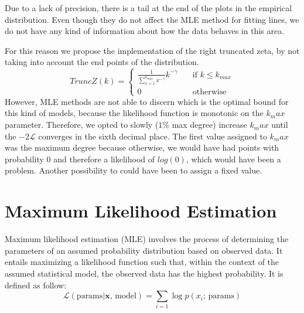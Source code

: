\documentclass{article}
\begin{document}
Due to a lack of precision, there is a tail at the end of the plots in the empirical distribution. Even though they do not affect the MLE method for fitting lines, we do not have any kind of information about how the data behaves in this area.

For this reason we propose the implementation of the right truncated zeta, by not taking into account the end points of the distribution.
$$
    TruncZ(k) = \begin{cases}
    \frac{1}{\sum_{x=1}^{k_{max}}x^{-\gamma}}k^{-\gamma}       & \quad \text{if } k \leq k_{max}\\
    0  & \quad \text{otherwise}
  \end{cases}
$$
However, MLE methods are not able to discern which is the optimal bound for this kind of models, because the likelihood function is monotonic on the $k_max$ parameter. Therefore, we opted to slowly ($1\%$ max degree) increase $k_max$ until the $-2\mathcal{L}$ converges in the sixth decimal place. The first value assigned to $k_max$ was the maximum degree because otherwise, we would have had points with probability 0 and therefore a likelihood of $log(0)$, which would have been a problem. Another possibility to could have been to assign a fixed value. 

\section{Maximum Likelihood Estimation \label{sec:mle}}
Maximum likelihood estimation (MLE) involves the process of determining the parameters of an assumed probability distribution based on observed data. It entails maximizing a likelihood function such that, within the context of the assumed statistical model, the observed data has the highest probability. It is defined as follow:
$$
\mathcal{L}(\text{params} | \mathbf{x} \text{, model}) = \sum_{i=1} \log{p(x_i \text{; params})}
$$
\end{document}
